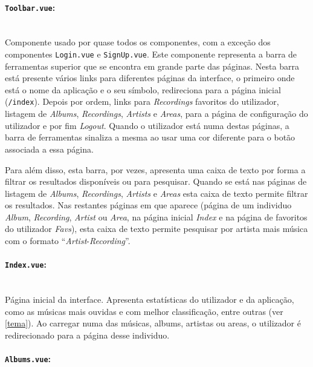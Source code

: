 \documentclass{article}
\begin{document}
\paragraph{\texttt{Toolbar.vue}:}\mbox{}\\

Componente usado por quase todos os componentes, com a exceção dos componentes \texttt{Login.vue} e \texttt{SignUp.vue}. Este componente representa a barra de ferramentas superior que se encontra em grande parte das páginas. Nesta barra está presente vários links para diferentes páginas da interface, o primeiro onde está o nome da aplicação e o seu símbolo, redireciona para a página inicial (\texttt{/index}). Depois por ordem, links para \textit{Recordings} favoritos do utilizador, listagem de \textit{Albums}, \textit{Recordings}, \textit{Artists} e \textit{Areas}, para a página de configuração do utilizador e por fim \textit{Logout}. Quando o utilizador está numa destas páginas, a barra de ferramentas sinaliza a mesma ao usar uma cor diferente para o botão associada a essa página.

Para além disso, esta barra, por vezes, apresenta uma caixa de texto por forma a filtrar os resultados disponíveis ou para pesquisar. Quando se está nas páginas de listagem de \textit{Albums}, \textit{Recordings}, \textit{Artists} e \textit{Areas} esta caixa de texto permite filtrar os resultados. Nas restantes páginas em que aparece (página de um individuo \textit{Album}, \textit{Recording}, \textit{Artist} ou \textit{Area}, na página inicial \textit{Index} e na página de favoritos do utilizador \textit{Favs}), esta caixa de texto permite pesquisar por artista mais música com o formato ``\textit{Artist}-\textit{Recording}''.

\paragraph{\texttt{Index.vue}:}\mbox{}\\

Página inicial da interface. Apresenta estatísticas do utilizador e da aplicação, como as músicas mais ouvidas e com melhor classificação, entre outras (ver \ref{tema}). Ao carregar numa das músicas, albums, artistas ou areas, o utilizador é redirecionado para a página desse individuo.

\paragraph{\texttt{Albums.vue}:}\mbox{}\\
\end{document}
